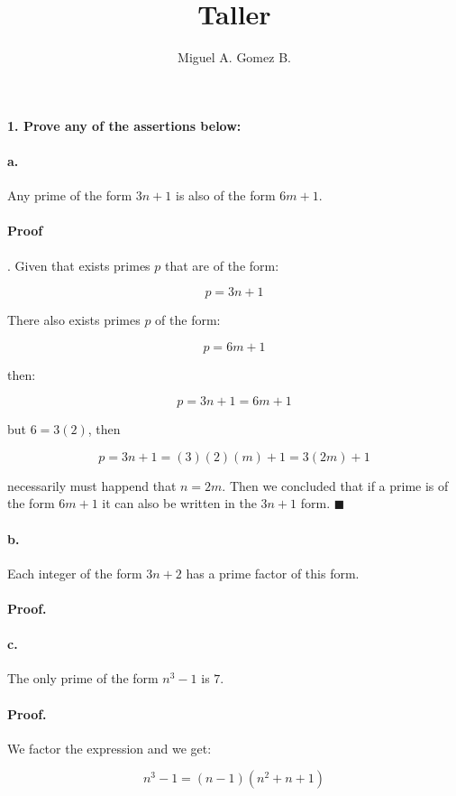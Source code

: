 \documentclass{article}
\title{Taller}
\author{Miguel A. Gomez B.}
\begin{document}
	\maketitle
\paragraph{1. Prove any of the assertions below:}
\paragraph{a.} Any prime of the form $3n+1$ is also of the form $6m + 1$.

\paragraph{Proof}. Given that exists primes $p$ that are of the form:

$$p = 3n + 1$$

There also exists primes $p$ of the form:

$$p = 6m + 1$$

then:

$$p = 3n + 1 = 6m + 1$$

but $6 = 3(2)$, then

$$p = 3n + 1 = (3)(2)(m) + 1 = 3(2m) + 1$$

necessarily must happend that $n = 2m$. Then we concluded that if a prime is of the form $6m + 1$ it can also be written in the $3n+1$ form. $\blacksquare$

\paragraph{b.} Each integer of the form $3n + 2$ has a prime factor of this form.

\paragraph{Proof.}

\paragraph{c.} The only prime of the form $n^3 - 1$ is $7$.

\paragraph{Proof.} We factor the expression and we get:

$$n^3 - 1 = (n - 1)(n^2 + n + 1)$$
\end{document}
